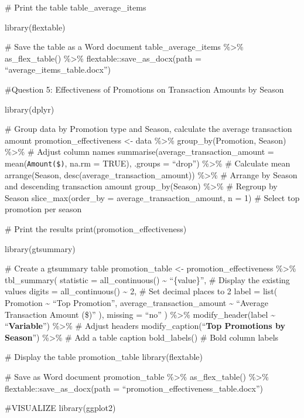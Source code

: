 \documentclass[
]{article}
\begin{document}
\# Print the table table\_average\_items

library(flextable)

\# Save the table as a Word document table\_average\_items
\%\textgreater\% as\_flex\_table() \%\textgreater\%
flextable::save\_as\_docx(path = ``average\_items\_table.docx'')

\#Question 5: Effectiveness of Promotions on Transaction Amounts by
Season

library(dplyr)

\# Group data by Promotion type and Season, calculate the average
transaction amount promotion\_effectiveness \textless- data
\%\textgreater\% group\_by(Promotion, Season) \%\textgreater\% \# Adjust
column names summarise(average\_transaction\_amount =
mean(\texttt{Amount(\$)}, na.rm = TRUE), .groups = ``drop'')
\%\textgreater\% \# Calculate mean arrange(Season,
desc(average\_transaction\_amount)) \%\textgreater\% \# Arrange by
Season and descending transaction amount group\_by(Season)
\%\textgreater\% \# Regroup by Season slice\_max(order\_by =
average\_transaction\_amount, n = 1) \# Select top promotion per season

\# Print the results print(promotion\_effectiveness)

library(gtsummary)

\# Create a gtsummary table promotion\_table \textless-
promotion\_effectiveness \%\textgreater\% tbl\_summary( statistic =
all\_continuous() \textasciitilde{} ``\{value\}'', \# Display the
existing values digits = all\_continuous() \textasciitilde{} 2, \# Set
decimal places to 2 label = list( Promotion \textasciitilde{} ``Top
Promotion'', average\_transaction\_amount \textasciitilde{} ``Average
Transaction Amount (\$)'' ), missing = ``no'' ) \%\textgreater\%
modify\_header(label \textasciitilde{} ``\textbf{Variable}'')
\%\textgreater\% \# Adjust headers modify\_caption(``\textbf{Top
Promotions by Season}'') \%\textgreater\% \# Add a table caption
bold\_labels() \# Bold column labels

\# Display the table promotion\_table library(flextable)

\# Save as Word document promotion\_table \%\textgreater\%
as\_flex\_table() \%\textgreater\% flextable::save\_as\_docx(path =
``promotion\_effectiveness\_table.docx'')

\#VISUALIZE library(ggplot2)
\end{document}
